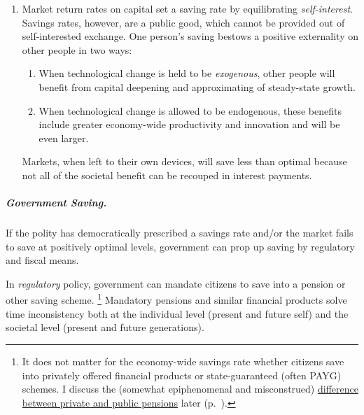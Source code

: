 \begin{enumerate}
	\item Market return rates on capital set a saving rate by equilibrating \emph{self-interest}.
Savings rates, however, are a public good, which cannot be provided out of self-interested exchange.
One person's saving  bestows a positive externality on other people in two ways:

	\begin{enumerate}
		\item When technological change is held to be \emph{exogenous}, other people will benefit from capital deepening and approximating of steady-state growth.
		\item When technological change is allowed to be endogenous, these benefits include greater economy-wide productivity and innovation and will be even larger.
	\end{enumerate}

	Markets, when left to their own devices, will save less than optimal because not all of the societal benefit can be recouped in interest payments.
\end{enumerate}

\subparagraph{Government Saving.}  \label{sec:government-saves} If the polity has democratically prescribed a savings rate and/or the market fails to save at positively optimal levels, government can prop up saving by regulatory and fiscal means.

In \emph{regulatory} policy, government can mandate citizens to save into a pension or other saving scheme.
\footnote{
	It does not matter for the economy-wide savings rate whether citizens save into privately offered financial products or state-guaranteed (often \gls{PAYG}) schemes.
	I discuss the (somewhat epiphenomenal and misconstrued) \hyperref[sec:pensions]{difference between private and public pensions} later (p.~\pageref{sec:pensions}).
}
Mandatory pensions and similar financial products solve time inconsistency both at the individual level (present and future self) and the societal level (present and future generations).

